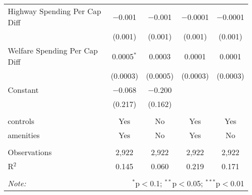 \begin{table}[!htbp]
\begin{tabular}{@{\extracolsep{5pt}}lcccc}
  Highway Spending Per Cap Diff & $-$0.001 & $-$0.001 & $-$0.0001 & $-$0.0001 \\ 
  & (0.001) & (0.001) & (0.001) & (0.001) \\ 
  Welfare Spending Per Cap Diff & 0.0005$^{*}$ & 0.0003 & 0.0001 & 0.0001 \\ 
  & (0.0003) & (0.0005) & (0.0003) & (0.0003) \\ 
  Constant & $-$0.068 & $-$0.200 &  &  \\ 
  & (0.217) & (0.162) &  &  \\ 
 \hline \\[-1.8ex] 
controls & Yes & No & Yes & Yes \\ 
amenities & Yes & No & Yes & No \\ 
\hline \\[-1.8ex] 
Observations & 2,922 & 2,922 & 2,922 & 2,922 \\ 
R$^{2}$ & 0.145 & 0.060 & 0.219 & 0.171 \\ 
\hline 
\hline \\[-1.8ex] 
\textit{Note:}  & \multicolumn{4}{r}{$^{*}$p$<$0.1; $^{**}$p$<$0.05; $^{***}$p$<$0.01} \\ 
\end{tabular} 
\end{table} 
